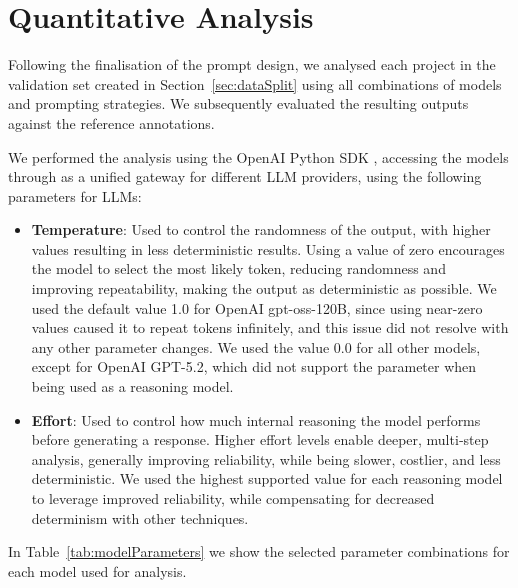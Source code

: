 \section{Quantitative Analysis}\label{sec:experimentsQuantitative}

Following the finalisation of the prompt design, we analysed each project in the validation set created in Section~\ref{sec:dataSplit} using all combinations of models and prompting strategies. We subsequently evaluated the resulting outputs against the reference annotations.

We performed the analysis using the OpenAI Python SDK , accessing the models through  as a unified gateway for different LLM providers, using the following parameters for LLMs:

\begin{itemize}
    \item \textbf{Temperature}: Used to control the randomness of the output, with higher values resulting in less deterministic results. Using a value of zero encourages the model to select the most likely token, reducing randomness and improving repeatability, making the output as deterministic as possible. We used the default value \num{1.0} for OpenAI gpt-oss-120B, since using near-zero values caused it to repeat tokens infinitely, and this issue did not resolve with any other parameter changes. We used the value \num{0.0} for all other models, except for OpenAI GPT-5.2, which did not support the parameter when being used as a reasoning model.
    \item \textbf{Effort}: Used to control how much internal reasoning the model performs before generating a response. Higher effort levels enable deeper, multi‑step analysis, generally improving reliability, while being slower, costlier, and less deterministic. We used the highest supported value for each reasoning model to leverage improved reliability, while compensating for decreased determinism with other techniques.
\end{itemize}

In Table~\ref{tab:modelParameters} we show the selected parameter combinations for each model used for analysis.

